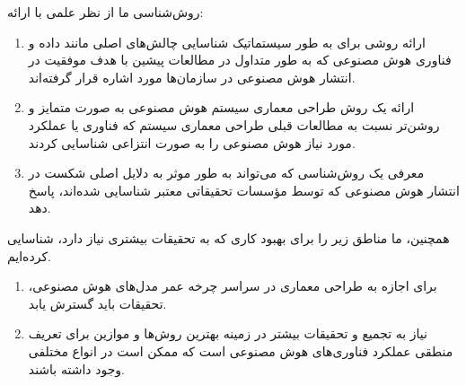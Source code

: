 \documentclass[a4paper,10pt]{article}
\begin{document}
    \newpage
    

    روش‌شناسی ما از نظر علمی با ارائه:

        \begin{enumerate}
            
            \item ارائه روشی برای به طور سیستماتیک شناسایی چالش‌های اصلی مانند داده و فناوری هوش مصنوعی که به طور متداول در مطالعات پیشین با هدف موفقیت در انتشار هوش مصنوعی در سازمان‌ها مورد اشاره قرار گرفته‌اند.

            \item ارائه یک روش طراحی معماری سیستم هوش مصنوعی به صورت متمایز و روشن‌تر نسبت به مطالعات قبلی طراحی معماری سیستم که فناوری یا عملکرد مورد نیاز هوش مصنوعی را به صورت انتزاعی شناسایی کردند.

            \item معرفی یک روش‌شناسی که می‌تواند به طور موثر به دلایل اصلی شکست در انتشار هوش مصنوعی که توسط مؤسسات تحقیقاتی معتبر شناسایی شده‌اند، پاسخ دهد.

        \end{enumerate}

    \newpage


    همچنین، ما مناطق زیر را برای بهبود کاری که به تحقیقات بیشتری نیاز دارد، شناسایی کرده‌ایم.

    \begin{enumerate}
        
        \item برای اجازه به طراحی معماری در سراسر چرخه عمر مدل‌های هوش مصنوعی، تحقیقات باید گسترش یابد.

        \item نیاز به تجمیع و تحقیقات بیشتر در زمینه بهترین روش‌ها و موازین برای تعریف منطقی عملکرد فناوری‌های هوش مصنوعی است که ممکن است در انواع مختلفی وجود داشته باشند.

    \end{enumerate}
\end{document}
